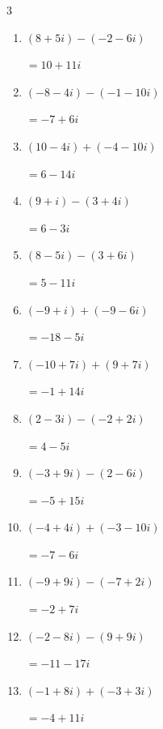 \begin{multicols}{3}
\begin{enumerate}
        $\displaystyle =9$

  \item $\displaystyle (8+5i) - (-2-6i)$

        $\displaystyle =10+11i$

  \item $\displaystyle (-8-4i) - (-1-10i)$

        $\displaystyle =-7+6i$

  \item $\displaystyle (10-4i) + (-4-10i)$

        $\displaystyle =6-14i$

  \item $\displaystyle (9+i) - (3+4i)$

        $\displaystyle =6-3i$

  \item $\displaystyle (8-5i) - (3+6i)$

        $\displaystyle =5-11i$

  \item $\displaystyle (-9+i) + (-9-6i)$

        $\displaystyle =-18-5i$

  \item $\displaystyle (-10+7i) + (9+7i)$

        $\displaystyle =-1+14i$

\columnbreak %

  \item $\displaystyle (2-3i) - (-2+2i)$

        $\displaystyle =4-5i$

  \item $\displaystyle (-3+9i) - (2-6i)$

        $\displaystyle =-5+15i$

  \item $\displaystyle (-4+4i) + (-3-10i)$

        $\displaystyle =-7-6i$

  \item $\displaystyle (-9+9i) - (-7+2i)$

        $\displaystyle =-2+7i$

  \item $\displaystyle (-2-8i) - (9+9i)$

        $\displaystyle =-11-17i$

  \item $\displaystyle (-1+8i) + (-3+3i)$

        $\displaystyle =-4+11i$


\end{enumerate}
\end{multicols}
